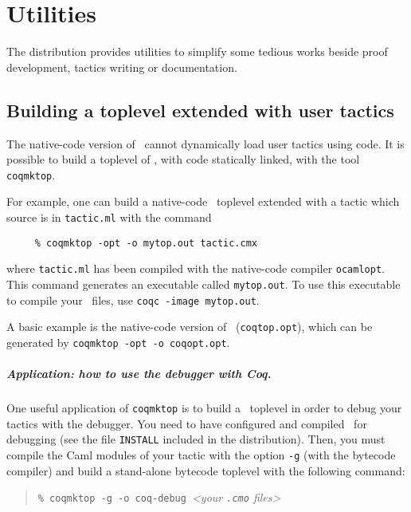 \chapter[Utilities]{Utilities\label{Utilities}}

The distribution provides utilities to simplify some tedious works
beside proof development, tactics writing or documentation.

\section[Building a toplevel extended with user tactics]{Building a toplevel extended with user tactics\label{Coqmktop}}

The native-code version of \Coq\ cannot dynamically load user tactics
using {\ocaml} code. It is possible to build a toplevel of \Coq,
with {\ocaml} code statically linked, with the tool {\tt
  coqmktop}.

For example, one can build a native-code \Coq\ toplevel extended with a tactic
which source is in {\tt tactic.ml} with the command 
\begin{verbatim}
     % coqmktop -opt -o mytop.out tactic.cmx
\end{verbatim}
where {\tt tactic.ml} has been compiled with the native-code
compiler {\tt ocamlopt}. This command generates an executable
called {\tt mytop.out}. To use this executable to compile your \Coq\
files, use {\tt coqc -image mytop.out}.

A basic example is the native-code version of \Coq\ ({\tt coqtop.opt}),
which can be generated by {\tt coqmktop -opt -o coqopt.opt}.


\paragraph[Application: how to use the {\ocaml} debugger with Coq.]{Application: how to use the {\ocaml} debugger with Coq.}

One useful application of \texttt{coqmktop} is to build a \Coq\ toplevel in
order to debug your tactics with the {\ocaml} debugger.
You need to have configured and compiled \Coq\ for debugging
(see the file \texttt{INSTALL} included in the distribution).
Then, you must compile the Caml modules of your tactic with the
option \texttt{-g} (with the bytecode compiler) and build a stand-alone
bytecode toplevel with the following command:

\begin{quotation}
\texttt{\% coqmktop -g -o coq-debug}~\emph{<your \texttt{.cmo} files>}
\end{quotation}


